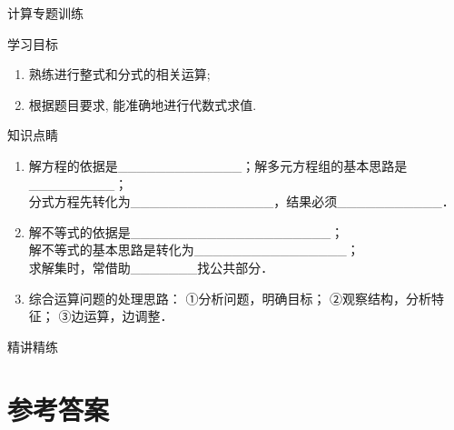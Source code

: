 \begin{center}
{\kaishu{}计算专题训练}
\end{center}


{\heiti 学习目标}
\begin{enumerate}
\item
熟练进行整式和分式的相关运算;

\item
根据题目要求, 能准确地进行代数式求值.
\end{enumerate}

{\heiti 知识点睛}

\begin{enumerate}
\item 解方程的依据是{\_}{\_}{\_}{\_}{\_}{\_}{\_}{\_}{\_}{\_}{\_}{\_}{\_}；解多元方程组的基本思路是{\_}{\_}{\_}{\_}{\_}{\_}{\_}{\_}{\_}；\\
分式方程先转化为{\_}{\_}{\_}{\_}{\_}{\_}{\_}{\_}{\_}{\_}{\_}{\_}{\_}{\_}{\_}，结果必须{\_}{\_}{\_}{\_}{\_}{\_}{\_}{\_}{\_}{\_}{\_}．
\item 解不等式的依据是{\_}{\_}{\_}{\_}{\_}{\_}{\_}{\_}{\_}{\_}{\_}{\_}{\_}{\_}{\_}{\_}{\_}{\_}{\_}{\_}{\_}；\\
解不等式的基本思路是转化为{\_}{\_}{\_}{\_}{\_}{\_}{\_}{\_}{\_}{\_}{\_}{\_}{\_}{\_}{\_}{\_}；\\
求解集时，常借助{\_}{\_}{\_}{\_}{\_}{\_}{\_}找公共部分．
\item 综合运算问题的处理思路：
①分析问题，明确目标；
②观察结构，分析特征；
③边运算，边调整．

\end{enumerate}

{\heiti 精讲精练}

\begin{enumerate}
\foreachproblem[20190603T16-1]{\item\label{prob:\thisproblemlabel}\thisproblem}\vfill\null
\foreachproblem[20190603T16-2]{\item\label{prob:\thisproblemlabel}\thisproblem}\null\newpage
\foreachproblem[20190603T16-3]{\item\label{prob:\thisproblemlabel}\thisproblem}\vfill\null
\foreachproblem[20190603T16-4]{\item\label{prob:\thisproblemlabel}\thisproblem}\vfill\null\newpage
\foreachproblem[20190603T16-5]{\item\label{prob:\thisproblemlabel}\thisproblem}\vfill\null
\foreachproblem[20190603T16-6]{\item\label{prob:\thisproblemlabel}\thisproblem}\vfill\null\newpage
\foreachproblem[20190603T16-7]{\item\label{prob:\thisproblemlabel}\thisproblem}\vfill

\end{enumerate}



\newpage
\showanswers
\section*{参考答案}
\begin{enumerate}
\foreachdataset{\thisdataset}{%
\foreachproblem[\thisdataset]{\item[\ref{prob:\thisproblemlabel}]\thisproblem}}
\end{enumerate}

